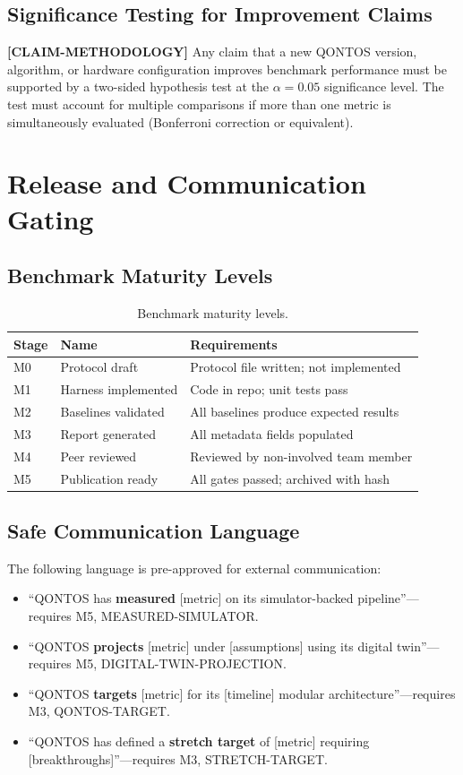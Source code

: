 \documentclass[conference]{IEEEtran}
\begin{document}
\subsection{Significance Testing for Improvement Claims}

\textbf{[CLAIM-METHODOLOGY]} Any claim that a new QONTOS version, algorithm, or hardware configuration improves benchmark performance must be supported by a two-sided hypothesis test at the $\alpha = 0.05$ significance level. The test must account for multiple comparisons if more than one metric is simultaneously evaluated (Bonferroni correction or equivalent).

\section{Release and Communication Gating}

\subsection{Benchmark Maturity Levels}

\begin{table}[H]
\centering
\caption{Benchmark maturity levels.}
\begin{tabular}{@{}l l L{4cm}@{}}
\toprule
\textbf{Stage} & \textbf{Name} & \textbf{Requirements} \\
\midrule
M0 & Protocol draft & Protocol file written; not implemented \\
M1 & Harness implemented & Code in repo; unit tests pass \\
M2 & Baselines validated & All baselines produce expected results \\
M3 & Report generated & All metadata fields populated \\
M4 & Peer reviewed & Reviewed by non-involved team member \\
M5 & Publication ready & All gates passed; archived with hash \\
\bottomrule
\end{tabular}
\end{table}

\subsection{Safe Communication Language}

The following language is pre-approved for external communication:

\begin{itemize}[leftmargin=*]
\item ``QONTOS has \textbf{measured} [metric] on its simulator-backed pipeline''---requires M5, MEASURED-SIMULATOR.
\item ``QONTOS \textbf{projects} [metric] under [assumptions] using its digital twin''---requires M5, DIGITAL-TWIN-PROJECTION.
\item ``QONTOS \textbf{targets} [metric] for its [timeline] modular architecture''---requires M3, QONTOS-TARGET.
\item ``QONTOS has defined a \textbf{stretch target} of [metric] requiring [breakthroughs]''---requires M3, STRETCH-TARGET.
\end{itemize}
\end{document}
